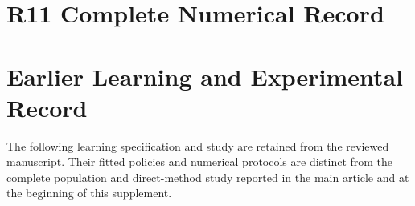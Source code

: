 \documentclass[ecta,nameyear,draft]{econsocart}
\theoremstyle{definition}
\theoremstyle{remark}
\begin{document}
\section{R11 Complete Numerical Record}\label{app:r11record}





\section{Earlier Learning and Experimental Record}
The following learning specification and study are retained from the reviewed manuscript. Their fitted policies and numerical protocols are distinct from the complete population and direct-method study reported in the main article and at the beginning of this supplement.




\end{document}

